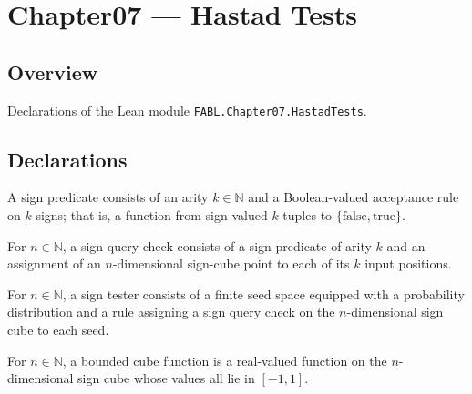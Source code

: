 \chapter{Chapter07 — Hastad Tests}
\section{Overview}

Declarations of the Lean module \texttt{FABL.Chapter07.HastadTests}.

\section{Declarations}

\begin{definition}
\label{FABL.SignPredicate}
\leanok
{}
A sign predicate consists of an arity $k\in\mathbb N$ and a Boolean-valued acceptance
rule on $k$ signs; that is, a function from sign-valued $k$-tuples to
$\{\mathrm{false},\mathrm{true}\}$.
\end{definition}

\begin{definition}
\label{FABL.SignQueryCheck}
\leanok
{}
For $n\in\mathbb N$, a sign query check consists of a sign predicate of arity $k$ and an
assignment of an $n$-dimensional sign-cube point to each of its $k$ input positions.
\end{definition}

\begin{definition}
\label{FABL.SignTester}
\leanok
{}
For $n\in\mathbb N$, a sign tester consists of a finite seed space equipped with a
probability distribution and a rule assigning a sign query check on the $n$-dimensional
sign cube to each seed.
\end{definition}

\begin{definition}
\label{FABL.BoundedCubeFunction}
\leanok
For $n\in\mathbb N$, a bounded cube function is a real-valued function on the
$n$-dimensional sign cube whose values all lie in $[-1,1]$.
\end{definition}

